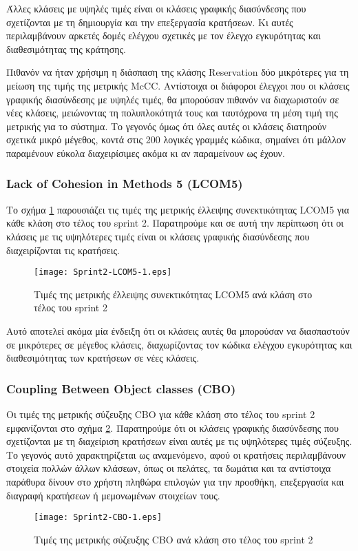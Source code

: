 Άλλες κλάσεις με υψηλές τιμές είναι οι κλάσεις γραφικής διασύνδεσης που
σχετίζονται με τη δημιουργία και την επεξεργασία κρατήσεων. Κι αυτές
περιλαμβάνουν αρκετές δομές ελέγχου σχετικές με τον έλεγχο εγκυρότητας
και διαθεσιμότητας της κράτησης.

Πιθανόν να ήταν χρήσιμη η διάσπαση της κλάσης Reservation δύο
μικρότερες
για τη μείωση της τιμής της μετρικής McCC. Αντίστοιχα οι διάφοροι
έλεγχοι που οι κλάσεις γραφικής διασύνδεσης με υψηλές τιμές, θα
μπορούσαν πιθανόν να διαχωριστούν σε νέες κλάσεις, μειώνοντας τη
πολυπλοκότητά τους και ταυτόχρονα τη μέση τιμή της μετρικής για το
σύστημα. Το γεγονός όμως ότι όλες αυτές οι κλάσεις διατηρούν σχετικά
μικρό μέγεθος, κοντά στις 200 λογικές γραμμές κώδικα, σημαίνει ότι
μάλλον παραμένουν εύκολα διαχειρίσιμες ακόμα κι αν παραμείνουν ως έχουν.

\subsubsection{Lack of Cohesion in Methods 5 (LCOM5)}
\label{section:sprint2LCOM5}

Το σχήμα \ref{fig:sprint2LCOM5} παρουσιάζει τις τιμές της μετρικής
έλλειψης συνεκτικότητας LCOM5 για κάθε κλάση στο τέλος του sprint 2.
Παρατηρούμε και σε αυτή την περίπτωση ότι οι κλάσεις με τις υψηλότερες
τιμές είναι οι κλάσεις γραφικής διασύνδεσης που διαχειρίζονται τις
κρατήσεις.

\begin{figure}
\centering
\texttt{[image: Sprint2-LCOM5-1.eps]}
\caption{Τιμές της μετρικής έλλειψης συνεκτικότητας LCOM5 ανά κλάση στο τέλος του sprint 2}
\label{fig:sprint2LCOM5}
\end{figure}

Αυτό αποτελεί ακόμα μία ένδειξη ότι οι κλάσεις αυτές θα
μπορούσαν να διασπαστούν σε μικρότερες σε μέγεθος κλάσεις, διαχωρίζοντας
τον κώδικα ελέγχου εγκυρότητας και διαθεσιμότητας των κρατήσεων σε
νέες κλάσεις.

\subsubsection{Coupling Between Object classes (CBO)}
\label{section:sprint2CBO}

Οι τιμές της μετρικής σύζευξης CBO για κάθε κλάση στο τέλος του sprint 2
εμφανίζονται στο σχήμα \ref{fig:sprint2CBO}. Παρατηρούμε ότι οι κλάσεις
γραφικής διασύνδεσης που σχετίζονται με τη διαχείριση κρατήσεων είναι
αυτές με τις υψηλότερες τιμές σύζευξης. Το γεγονός αυτό χαρακτηρίζεται
ως αναμενόμενο, αφού οι κρατήσεις περιλαμβάνουν στοιχεία πολλών άλλων
κλάσεων, όπως οι πελάτες, τα δωμάτια και τα αντίστοιχα παράθυρα δίνουν
στο χρήστη πληθώρα επιλογών για την προσθήκη, επεξεργασία και διαγραφή
κρατήσεων ή μεμονωμένων στοιχείων τους.

\begin{figure}
\centering
\texttt{[image: Sprint2-CBO-1.eps]}
\caption{Τιμές της μετρικής σύζευξης CBO ανά κλάση στο τέλος του sprint 2}
\label{fig:sprint2CBO}
\end{figure}
